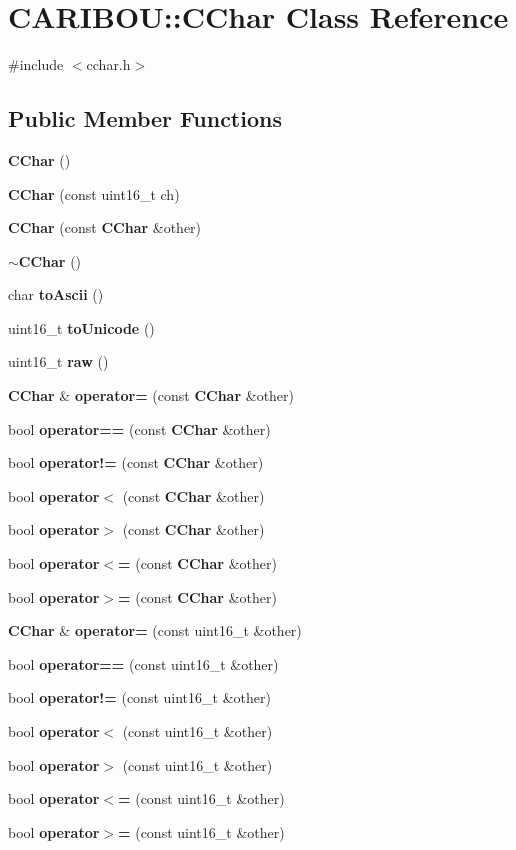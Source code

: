 \section{C\+A\+R\+I\+B\+OU\+:\+:C\+Char Class Reference}
\label{class_c_a_r_i_b_o_u_1_1_c_char}


{\ttfamily \#include $<$cchar.\+h$>$}

\subsection*{Public Member Functions}
\begin{DoxyCompactItemize}
\item 
{\bf C\+Char} ()
\item 
{\bf C\+Char} (const uint16\+\_\+t ch)
\item 
{\bf C\+Char} (const {\bf C\+Char} \&other)
\item 
{\bf $\sim$\+C\+Char} ()
\item 
char {\bf to\+Ascii} ()
\item 
uint16\+\_\+t {\bf to\+Unicode} ()
\item 
uint16\+\_\+t {\bf raw} ()
\item 
{\bf C\+Char} \& {\bf operator=} (const {\bf C\+Char} \&other)
\item 
bool {\bf operator==} (const {\bf C\+Char} \&other)
\item 
bool {\bf operator!=} (const {\bf C\+Char} \&other)
\item 
bool {\bf operator$<$} (const {\bf C\+Char} \&other)
\item 
bool {\bf operator$>$} (const {\bf C\+Char} \&other)
\item 
bool {\bf operator$<$=} (const {\bf C\+Char} \&other)
\item 
bool {\bf operator$>$=} (const {\bf C\+Char} \&other)
\item 
{\bf C\+Char} \& {\bf operator=} (const uint16\+\_\+t \&other)
\item 
bool {\bf operator==} (const uint16\+\_\+t \&other)
\item 
bool {\bf operator!=} (const uint16\+\_\+t \&other)
\item 
bool {\bf operator$<$} (const uint16\+\_\+t \&other)
\item 
bool {\bf operator$>$} (const uint16\+\_\+t \&other)
\item 
bool {\bf operator$<$=} (const uint16\+\_\+t \&other)
\item 
bool {\bf operator$>$=} (const uint16\+\_\+t \&other)
\end{DoxyCompactItemize}


